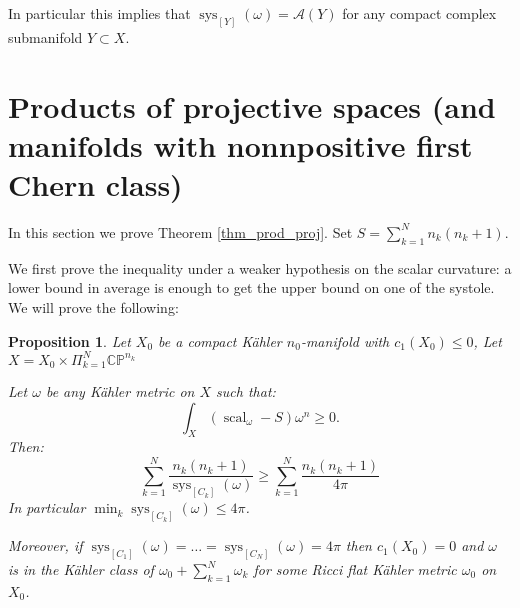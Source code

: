 \documentclass{amsart}
\newtheorem{proposition}[theorem]{Proposition}
\numberwithin{equation}{section}
\theoremstyle{definition}
\DeclareMathOperator{\scal}{scal}
\DeclareMathOperator{\sys}{sys}
\begin{document}
In particular this implies that $\sys_{[Y]}(\omega)=\mathcal{A}(Y)$ for any compact complex submanifold $Y\subset X$.


\section{Products of projective spaces (and manifolds with nonnpositive first Chern class)}

In this section we prove Theorem \ref{thm_prod_proj}.
Set $S=\sum_{k=1}^N n_k(n_k+1)$.

We first prove the inequality under a weaker hypothesis on the scalar curvature: a lower bound in average is enough to get the upper bound on one of the systole. We will prove the following:
\begin{proposition}
\label{thm_prod_proj_avg}
Let $X_0$ be a compact K\"ahler $n_0$-manifold with $c_1(X_0)\leq 0$, %
Let $X=X_0\times\Pi_{k=1}^N\mathbb{CP}^{n_k}$ %

Let $\omega$ be any K\"ahler metric on $X$ such that:
\[\int_X(\scal_\omega-S)\omega^n\geq 0.\]
Then:
\[\sum_{k=1}^N\frac{n_k(n_k+1)}{\sys_{[C_k]}(\omega)}\geq \sum_{k=1}^N \frac{n_k(n_k+1)}{4\pi}\]
In particular $\min_k \sys_{[C_k]}(\omega) \leq 4\pi$.

Moreover, if $\sys_{[C_1]}(\omega)=\dots= \sys_{[C_N]}(\omega)=4\pi$ then $c_1(X_0)=0$ and $\omega$ is in the K\"ahler class of $\omega_0+\sum_{k=1}^N\omega_k$ for some Ricci flat K\"ahler metric $\omega_0$ on $X_0$.
\end{proposition}
\end{document}
